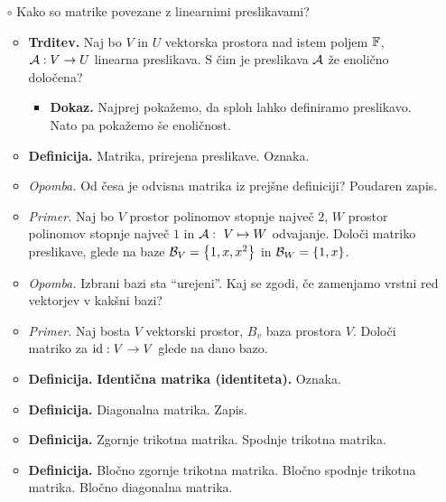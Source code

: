 \begin{enumerate}
    \item[$\circ$] Kako so matrike povezane z linearnimi preslikavami?      
    \begin{itemize}          
        \item \colorbox{blue!30}{\textbf{Trditev.}} Naj bo $V$ in $U$ vektorska prostora nad istem poljem $\mathbb{F}$, $\mathcal{A}: V \to U$ linearna preslikava. S čim je preslikava $\mathcal{A}$ že enolično določena?
        \begin{itemize}
            \item \colorbox{green!30}{\textbf{Dokaz.}} Najprej pokažemo, da sploh lahko definiramo preslikavo. Nato pa pokažemo še enoličnost.
        \end{itemize}
        \item \colorbox{purple!30}{\textbf{Definicija.}} Matrika, prirejena preslikave. Oznaka.
        \item \colorbox{yellow!30}{\emph{Opomba.}} Od česa je odvisna matrika iz prejšne definiciji? Poudaren zapis.
        \item \colorbox{yellow!30}{\emph{Primer.}} Naj bo $V$ prostor polinomov stopnje največ 2, $W$ prostor polinomov stopnje največ $1$ in $\mathcal{A}: \ V \mapsto W$ odvajanje. Določi matriko preslikave, glede na baze $\mathcal{B}_V = \left\{1, x, x^2\right\}$ in $\mathcal{B}_W = \left\{1, x\right\}$.
        \item \colorbox{yellow!30}{\emph{Opomba.}} Izbrani bazi sta "`urejeni"'. Kaj se zgodi, če zamenjamo vrstni red vektorjev v kakšni bazi?
        \item \colorbox{yellow!30}{\emph{Primer.}} Naj bosta $V$ vektorski prostor, $B_v$ baza prostora $V$. Določi matriko za $\operatorname{id}: V \to V$ glede na dano bazo. 
        \item \colorbox{purple!30}{\textbf{Definicija.}} \textbf{Identična matrika (identiteta).} Oznaka.
        \item \colorbox{purple!30}{\textbf{Definicija.}} Diagonalna matrika. Zapis.
        \item \colorbox{purple!30}{\textbf{Definicija.}} Zgornje trikotna matrika. Spodnje trikotna matrika.
        \item \colorbox{purple!30}{\textbf{Definicija.}} Bločno zgornje trikotna matrika. Bločno spodnje trikotna matrika. Bločno diagonalna matrika.
        

\end{itemize}
\end{enumerate}
